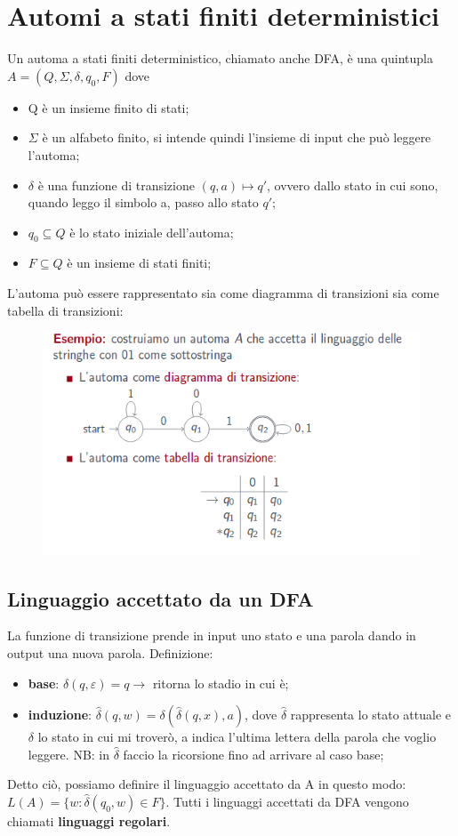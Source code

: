 \chapter{Automi a stati finiti deterministici}
Un automa a stati finiti deterministico, chiamato anche DFA, è una quintupla
$A=(Q, \Sigma, \delta, q_0, F)$ dove
\begin{itemize}
\item Q è un insieme finito di stati;
\item $\Sigma$ è un alfabeto finito, si intende quindi l'insieme di
input che può leggere l'automa;
\item $\delta$ è una funzione di transizione $(q,a) \mapsto q'$, ovvero 
dallo stato in cui sono, quando leggo il simbolo a, passo allo stato $q'$;
\item $q_0 \subseteq Q$ è lo stato iniziale dell'automa;
\item $F \subseteq Q$ è un insieme di stati finiti;
\end{itemize}
L'automa può essere rappresentato sia come diagramma di transizioni sia come tabella
di transizioni: 

\begin{figure}[h]
\centering 
\includegraphics[scale=0.5]{Immagini/DFA.png}
\end{figure}

\section{Linguaggio accettato da un DFA} 
La funzione di transizione prende in input uno stato e una parola dando in output
una nuova parola. Definizione:
\begin{itemize}
\item \textbf{base}: $\delta(q,\varepsilon)=q \rightarrow$ ritorna lo stadio in cui è;
\item \textbf{induzione}: $\widehat{\delta}(q,w)=\delta(\widehat{\delta}(q,x),a)$, 
dove $\widehat{\delta}$ rappresenta lo stato attuale e $\delta$ lo stato in cui mi 
troverò, a indica l'ultima lettera della parola che voglio leggere.
NB: in $\widehat{\delta}$ faccio la ricorsione fino ad arrivare al caso base;
\end{itemize}
Detto ciò, possiamo definire il linguaggio accettato da A in questo modo:
$L(A)=\{w: \widehat{\delta}(q_0,w) \in F\}$. Tutti i linguaggi accettati da DFA 
vengono chiamati \textbf{linguaggi regolari}.